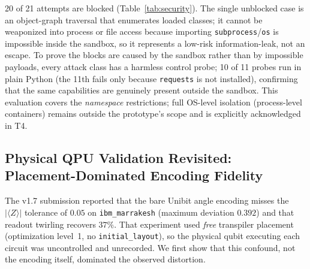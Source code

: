 ﻿\documentclass[12pt,a4paper]{article}
\begin{document}
\begin{table}[H]
\centering
\caption{Sandbox Security Evaluation: 21 Escape Attempts Against a 3-Layer Defense}
\label{tab:security}
\small
{}
\end{table}

20 of 21 attempts are blocked (Table~\ref{tab:security}). The single unblocked case is an object-graph traversal that enumerates loaded classes; it cannot be weaponized into process or file access because importing \texttt{subprocess}/\texttt{os} is impossible inside the sandbox, so it represents a low-risk information-leak, not an escape. To prove the blocks are caused by the sandbox rather than by impossible payloads, every attack class has a harmless control probe; 10 of 11 probes run in plain Python (the 11th fails only because \texttt{requests} is not installed), confirming that the same capabilities are genuinely present outside the sandbox. This evaluation covers the \emph{namespace} restrictions; full OS-level isolation (process-level containers) remains outside the prototype's scope and is explicitly acknowledged in T4.

\subsection{Physical QPU Validation Revisited: Placement-Dominated Encoding Fidelity}\label{sec:qpu}

The v1.7 submission reported that the bare Unibit angle encoding misses the $|\langle Z\rangle|$ tolerance of $0.05$ on \texttt{ibm\_marrakesh} (maximum deviation $0.392$) and that readout twirling recovers $37\%$. That experiment used \emph{free} transpiler placement (optimization level~1, no \texttt{initial\_layout}), so the physical qubit executing each circuit was uncontrolled and unrecorded. We first show that this confound, not the encoding itself, dominated the observed distortion.
\end{document}
